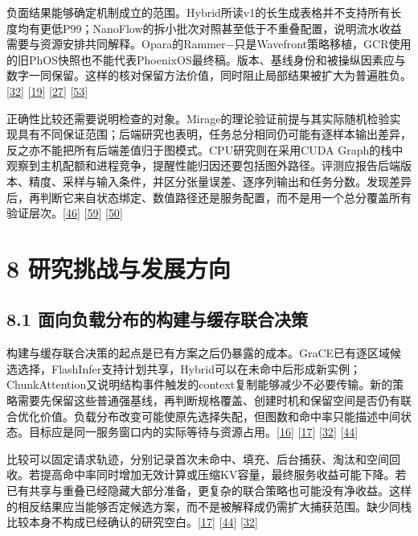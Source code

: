 \documentclass[
  11pt,
  UTF8]{ctexart}
\begin{document}
负面结果能够确定机制成立的范围。Hybrid所读v1的长生成表格并不支持所有长度均有更低P99；NanoFlow的拆小批次对照甚至低于不重叠配置，说明流水收益需要与资源安排共同解释。Opara的Rammer−只是Wavefront策略移植，GCR使用的旧PhOS快照也不能代表PhoenixOS最终稿。版本、基线身份和被操纵因素应与数字一同保留。这样的核对保留方法价值，同时阻止局部结果被扩大为普遍胜负。{[}\protect\hyperlink{ref-yadav2026hybridpreprint}{32}{]}
{[}\protect\hyperlink{ref-zhu2025nanoflow}{19}{]}
{[}\protect\hyperlink{ref-chen2025opara}{27}{]}
{[}\protect\hyperlink{ref-zeng2026gcr}{53}{]}

正确性比较还需要说明检查的对象。Mirage的理论验证前提与其实际随机检验实现具有不同保证范围；后端研究也表明，任务总分相同仍可能有逐样本输出差异，反之亦不能把所有后端差值归于图模式。CPU研究则在采用CUDA
Graph的栈中观察到主机配额和进程竞争，提醒性能归因还要包括图外路径。评测应报告后端版本、精度、采样与输入条件，并区分张量误差、逐序列输出和任务分数。发现差异后，再判断它来自状态绑定、数值路径还是服务配置，而不是用一个总分覆盖所有验证层次。{[}\protect\hyperlink{ref-wu2025mirage}{46}{]}
{[}\protect\hyperlink{ref-pape2026backend}{59}{]}
{[}\protect\hyperlink{ref-chung2026cpu}{50}{]}

\hypertarget{section-8}{%
\section{8 研究挑战与发展方向}\label{section-8}}

\hypertarget{section-8-1}{%
\subsection{8.1 面向负载分布的构建与缓存联合决策}\label{section-8-1}}

构建与缓存联合决策的起点是已有方案之后仍暴露的成本。GraCE已有逐区域候选选择，FlashInfer支持计划共享，Hybrid可以在未命中后形成新实例；ChunkAttention又说明结构事件触发的context复制能够减少不必要传输。新的策略需要先保留这些普通强基线，再判断规格覆盖、创建时机和保留空间是否仍有联合优化价值。负载分布改变可能使原先选择失配，但图数和命中率只能描述中间状态。目标应是同一服务窗口内的实际等待与资源占用。{[}\protect\hyperlink{ref-ghosh2026grace}{16}{]}
{[}\protect\hyperlink{ref-ye2025flashinfer}{17}{]}
{[}\protect\hyperlink{ref-yadav2026hybridpreprint}{32}{]}
{[}\protect\hyperlink{ref-ye2024chunkattention}{44}{]}

比较可以固定请求轨迹，分别记录首次未命中、填充、后台捕获、淘汰和空间回收。若提高命中率同时增加无效计算或压缩KV容量，最终服务收益可能下降。若已有共享与重叠已经隐藏大部分准备，更复杂的联合策略也可能没有净收益。这样的相反结果应当能够否定候选方案，而不是被解释成仍需扩大捕获范围。缺少同栈比较本身不构成已经确认的研究空白。{[}\protect\hyperlink{ref-ye2025flashinfer}{17}{]}
{[}\protect\hyperlink{ref-ye2024chunkattention}{44}{]}
{[}\protect\hyperlink{ref-yadav2026hybridpreprint}{32}{]}
\end{document}
